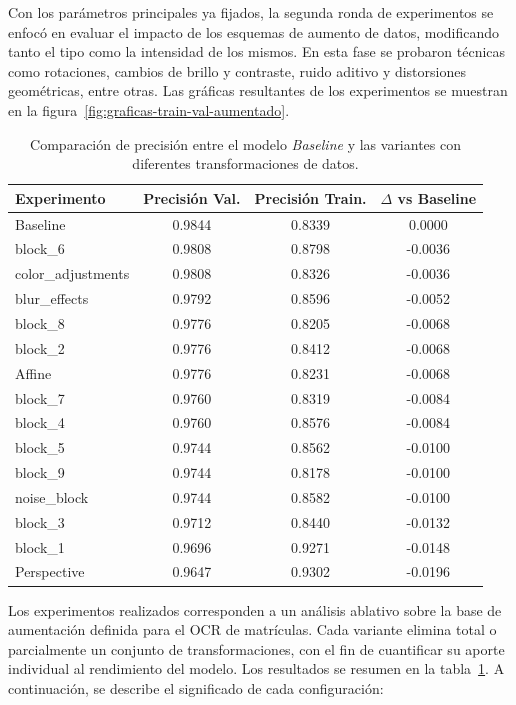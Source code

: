 Con los parámetros principales ya fijados,
la segunda ronda de experimentos se enfocó en evaluar el impacto de los esquemas de aumento de datos,
modificando tanto el tipo como la intensidad de los mismos.
En esta fase se probaron técnicas como rotaciones, cambios de brillo y contraste,
ruido aditivo y distorsiones geométricas, entre otras.
Las gráficas resultantes de los experimentos se muestran en la figura~\ref{fig:graficas-train-val-aumentado}.

\begin{table}[hb]
	\centering
	\begin{tabular}{lccc}
		\toprule
		\textbf{Experimento} & \textbf{Precisión Val.} & \textbf{Precisión Train.} & \textbf{$\Delta$ vs Baseline} \\
		\midrule
		Baseline & 0.9844 & 0.8339 & 0.0000 \\
		block\_6 & 0.9808 & 0.8798 & -0.0036 \\
		color\_adjustments & 0.9808 & 0.8326 & -0.0036 \\
		blur\_effects & 0.9792 & 0.8596 & -0.0052 \\
		block\_8 & 0.9776 & 0.8205 & -0.0068 \\
		block\_2 & 0.9776 & 0.8412 & -0.0068 \\
		Affine & 0.9776 & 0.8231 & -0.0068 \\
		block\_7 & 0.9760 & 0.8319 & -0.0084 \\
		block\_4 & 0.9760 & 0.8576 & -0.0084 \\
		block\_5 & 0.9744 & 0.8562 & -0.0100 \\
		block\_9 & 0.9744 & 0.8178 & -0.0100 \\
		noise\_block & 0.9744 & 0.8582 & -0.0100 \\
		block\_3 & 0.9712 & 0.8440 & -0.0132 \\
		block\_1 & 0.9696 & 0.9271 & -0.0148 \\
		Perspective & 0.9647 & 0.9302 & -0.0196 \\
		\bottomrule
	\end{tabular}
	\caption{Comparación de precisión entre el modelo \textit{Baseline} y 
	las variantes con diferentes transformaciones de datos.}
	\label{tab:ablations-baseline-diff}
\end{table}

Los experimentos realizados corresponden a un análisis ablativo sobre la
base de aumentación definida para el OCR de matrículas.
Cada variante elimina total o parcialmente un conjunto de transformaciones,
con el fin de cuantificar su aporte individual al rendimiento del modelo.
Los resultados se resumen en la tabla~\ref{tab:ablations-baseline-diff}.
A continuación, se describe el significado de cada configuración:

